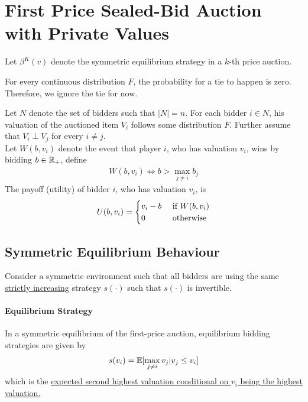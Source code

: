 \documentclass{article}
\begin{document}
	\section{First Price Sealed-Bid Auction with Private Values}
	\begin{notation}
		Let $\beta^K(v)$ denote the symmetric equilibrium strategy in a $k$-th price auction.
	\end{notation}
	
	\begin{remark}
		For every continuous distribution $F$, the probability for a tie to happen is zero. Therefore, we ignore the tie for now.
	\end{remark}
	
	\begin{definition}
	Let $N$ denote the set of bidders such that $|N| = n$. For each bidder $i \in N$, his valuation of the auctioned item $V_i$ follows some distribution $F$. Further assume that $V_i \perp V_j$ for every $i \neq j$. \\
	Let $W(b, v_i)$ denote the event that player $i$, who has valuation $v_i$, wins by bidding $b \in \mathbb{R}_+$, define 
	\begin{align}
		W(b, v_i) \iff b > \max_{j \neq i} b_j
	\end{align}
	The payoff (utility) of bidder $i$, who has valuation $v_i$, is
	\begin{align}
		U(b, v_i) = \begin{cases}
			v_i - b &\text{{ if }} W(b, v_i) \\
			0 &\text{{ otherwise}}
		\end{cases}
	\end{align}
	\end{definition}
	
	\subsection{Symmetric Equilibrium Behaviour}
	\par Consider a symmetric environment such that all bidders are using the same \ul{strictly increasing} strategy $s(\cdot)$ such that $s(\cdot)$ is invertible.
	\paragraph{Equilibrium Strategy}
	\begin{proposition}
		In a symmetric equilibrium of the first-price auction, equilibrium bidding strategies are given by
		\begin{align}
			s(v_i) = \mathbb{E}[{\max_{j \neq i} v_j | v_j \leq v_i}]
		\end{align}
		which is the \ul{expected second highest valuation conditional on $v_i$ being the highest valuation.}
	\end{proposition}
	
\end{document}
